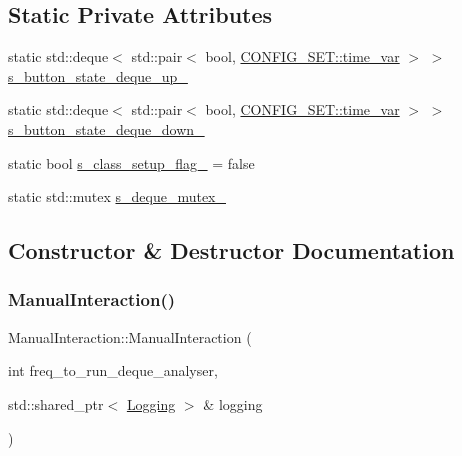 \subsection*{Static Private Attributes}
\begin{DoxyCompactItemize}
\item 
static std\+::deque$<$ std\+::pair$<$ bool, \hyperlink{namespaceCONFIG__SET_a8816a22e7885d027a52bfa0d24fa9008}{C\+O\+N\+F\+I\+G\+\_\+\+S\+E\+T\+::time\+\_\+var} $>$ $>$ \hyperlink{classManualInteraction_a5df30b855c3ff96adc45094788a13a4c}{s\+\_\+button\+\_\+state\+\_\+deque\+\_\+up\+\_\+}
\item 
static std\+::deque$<$ std\+::pair$<$ bool, \hyperlink{namespaceCONFIG__SET_a8816a22e7885d027a52bfa0d24fa9008}{C\+O\+N\+F\+I\+G\+\_\+\+S\+E\+T\+::time\+\_\+var} $>$ $>$ \hyperlink{classManualInteraction_ab2a0ebf12ae3ab8cf6149e46406d32f0}{s\+\_\+button\+\_\+state\+\_\+deque\+\_\+down\+\_\+}
\item 
static bool \hyperlink{classManualInteraction_a713dc9f822950e681926ccd0262ff43d}{s\+\_\+class\+\_\+setup\+\_\+flag\+\_\+} = false
\item 
static std\+::mutex \hyperlink{classManualInteraction_a3045262cebc202b03be78d14d74ebec2}{s\+\_\+deque\+\_\+mutex\+\_\+}
\end{DoxyCompactItemize}


\subsection{Constructor \& Destructor Documentation}
\mbox{\label{classManualInteraction_a6cad93bd00e4954a8eedacf590038f68}} 
\subsubsection{\texorpdfstring{Manual\+Interaction()}{ManualInteraction()}}
{\footnotesize\ttfamily Manual\+Interaction\+::\+Manual\+Interaction (\begin{DoxyParamCaption}\item[{int}]{freq\+\_\+to\+\_\+run\+\_\+deque\+\_\+analyser,  }\item[{std\+::shared\+\_\+ptr$<$ \hyperlink{classLogging}{Logging} $>$ \&}]{logging }\end{DoxyParamCaption})}




